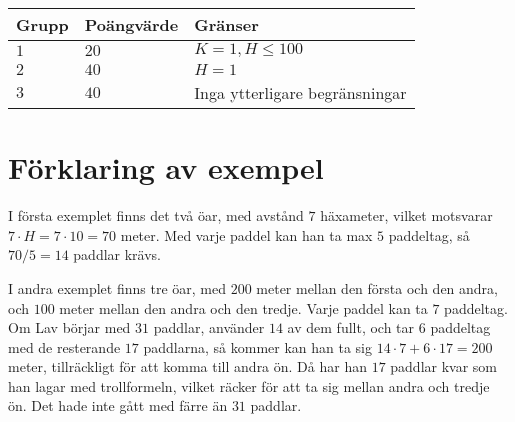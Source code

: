 \noindent
\begin{tabular}{| l | l | l |}
  \hline
  Grupp & Poängvärde & Gränser \\ \hline
  $1$    & $20$        &  $ K = 1, H \leq 100 $ \\ \hline 
  $2$    & $40$        &  $ H = 1 $ \\ \hline
  $3$    & $40$        &  Inga ytterligare begränsningar \\ \hline
\end{tabular}

\section*{Förklaring av exempel}

I första exemplet finns det två öar, med avstånd $7$ häxameter, vilket motsvarar
$7\cdot H = 7\cdot 10=70$ meter. Med varje paddel kan han ta max $5$ paddeltag, så $70/5 = 14$ paddlar krävs.

I andra exemplet finns tre öar, med $200$ meter mellan den första och den andra, och $100$ meter mellan
den andra och den tredje. Varje paddel kan ta $7$ paddeltag. Om Lav börjar med $31$ paddlar, använder
$14$ av dem fullt, och tar $6$ paddeltag med de resterande $17$ paddlarna, så kommer kan han ta sig
$14\cdot 7+6\cdot 17=200$ meter, tillräckligt för att komma till andra ön. Då har han $17$ paddlar
kvar som han lagar med trollformeln, vilket räcker för att ta sig mellan andra och tredje ön.
Det hade inte gått med färre än $31$ paddlar.
